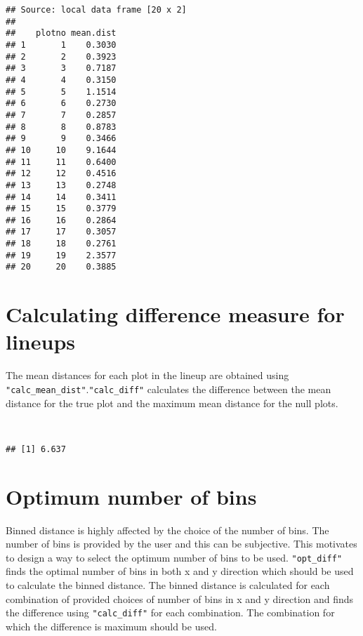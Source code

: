\begin{verbatim}
## Source: local data frame [20 x 2]
## 
##    plotno mean.dist
## 1       1    0.3030
## 2       2    0.3923
## 3       3    0.7187
## 4       4    0.3150
## 5       5    1.1514
## 6       6    0.2730
## 7       7    0.2857
## 8       8    0.8783
## 9       9    0.3466
## 10     10    9.1644
## 11     11    0.6400
## 12     12    0.4516
## 13     13    0.2748
## 14     14    0.3411
## 15     15    0.3779
## 16     16    0.2864
## 17     17    0.3057
## 18     18    0.2761
## 19     19    2.3577
## 20     20    0.3885
\end{verbatim}

\section{Calculating difference measure for
lineups}\label{calculating-difference-measure-for-lineups}

The mean distances for each plot in the lineup are obtained using
\texttt{"calc\_mean\_dist"}.\texttt{"calc\_diff"} calculates the
difference between the mean distance for the true plot and the maximum
mean distance for the null plots.

\begin{Shaded}
\begin{Highlighting}[]
\NormalTok{(}\NormalTok{(}\NormalTok{(} \NormalTok{), } \NormalTok{(}\NormalTok{, }\NormalTok{), } \\
 \NormalTok{, } \NormalTok{, } \NormalTok{)}
\end{Highlighting}
\end{Shaded}

\begin{verbatim}
## [1] 6.637
\end{verbatim}

\section{Optimum number of bins}\label{optimum-number-of-bins}

Binned distance is highly affected by the choice of the number of bins.
The number of bins is provided by the user and this can be subjective.
This motivates to design a way to select the optimum number of bins to
be used. \texttt{"opt\_diff"} finds the optimal number of bins in both x
and y direction which should be used to calculate the binned distance.
The binned distance is calculated for each combination of provided
choices of number of bins in x and y direction and finds the difference
using \texttt{"calc\_diff"} for each combination. The combination for
which the difference is maximum should be used.

